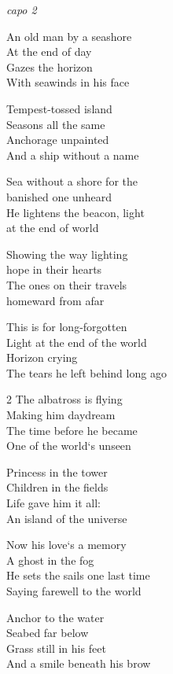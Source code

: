 
\re{}\textit{capo 2}

\ve{}
An old man by a seashore\\
At the end of day\\
Gazes the horizon\\
With seawinds in his face

Tempest-tossed island\\
Seasons all the same\\
Anchorage unpainted\\
And a ship without a name

\ve{}
Sea without a shore for the\\
banished one unheard\\
He lightens the beacon, light\\
at the end of world

Showing the way lighting\\
hope in their hearts\\
The ones on their travels\\
homeward from afar

\cho{}
This is for long-forgotten\\
Light at the end of the world\\
Horizon crying\\
The tears he left behind long ago

\begin{multicols}{2}
\ve{}
The albatross is flying\\
Making him daydream\\
The time before he became\\
One of the world`s unseen

Princess in the tower\\
Children in the fields\\
Life gave him it all:\\
An island of the universe

\ve{}
Now his love`s a memory\\
A ghost in the fog\\
He sets the sails one last time\\
Saying farewell to the world

Anchor to the water\\
Seabed far below\\
Grass still in his feet\\
And a smile beneath his brow
\end{multicols}

\cho{}

\esong{}